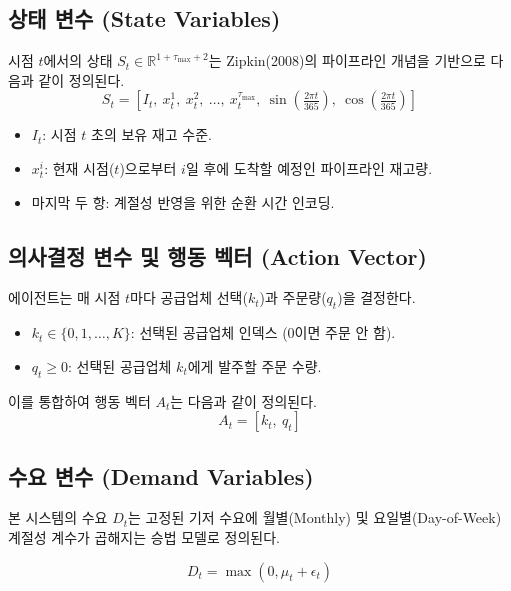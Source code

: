 \documentclass[a4paper, 11pt]{article}
\begin{document}
\subsection{상태 변수 (State Variables)}
시점 $t$에서의 상태 $S_t \in \mathbb{R}^{1 + \tau_{\max} + 2}$는 Zipkin(2008)의 파이프라인 개념을 기반으로 다음과 같이 정의된다.
\begin{equation}
    S_t = [I_t, \ x_t^1, \ x_t^2, \ \dots, \ x_t^{\tau_{\max}}, \ \sin(\tfrac{2\pi t}{365}), \ \cos(\tfrac{2\pi t}{365})]
\end{equation}
\begin{itemize}
    \item $I_t$: 시점 $t$ 초의 보유 재고 수준.
    \item $x_t^i$: 현재 시점($t$)으로부터 $i$일 후에 도착할 예정인 파이프라인 재고량.
    \item 마지막 두 항: 계절성 반영을 위한 순환 시간 인코딩.
\end{itemize}

\subsection{의사결정 변수 및 행동 벡터 (Action Vector)}
에이전트는 매 시점 $t$마다 공급업체 선택($k_t$)과 주문량($q_t$)을 결정한다.
\begin{itemize}
    \item $k_t \in \{0, 1, \dots, K\}$: 선택된 공급업체 인덱스 (0이면 주문 안 함).
    \item $q_t \ge 0$: 선택된 공급업체 $k_t$에게 발주할 주문 수량.
\end{itemize}
이를 통합하여 행동 벡터 $A_t$는 다음과 같이 정의된다.
\begin{equation}
    A_t = [k_t, \ q_t]
\end{equation}

\subsection{수요 변수 (Demand Variables)}
본 시스템의 수요 $D_t$는 고정된 기저 수요에 월별(Monthly) 및 요일별(Day-of-Week) 계절성 계수가 곱해지는 승법 모델로 정의된다.

\begin{equation}
    D_t = \max(0, \mu_t + \epsilon_t)
\end{equation}
\end{document}
